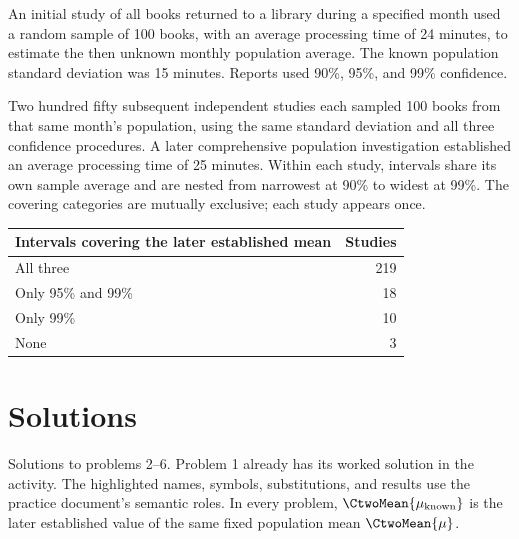 \noindent\begin{minipage}[t]{0.70\linewidth}
\vspace{0pt}
An initial study of all books returned to a library during a specified month used a random sample of 100 books, with an average processing time of 24 minutes, to estimate the then unknown monthly population average. The known population standard deviation was 15 minutes. Reports used 90\%, 95\%, and 99\% confidence.

Two hundred fifty subsequent independent studies each sampled 100 books from that same month's population, using the same standard deviation and all three confidence procedures. A later comprehensive population investigation established an average processing time of 25 minutes. Within each study, intervals share its own sample average and are nested from narrowest at 90\% to widest at 99\%. The covering categories are mutually exclusive; each study appears once.
\end{minipage}\hfill
\begin{minipage}[t]{0.28\linewidth}
\vspace{0pt}
\centering
\small
\setlength{\tabcolsep}{4pt}
\begin{tabularx}{\linewidth}{@{}>{\raggedright\arraybackslash}Xr@{}}\toprule
Intervals covering the later established mean & Studies\\\midrule
All three & 219\\
Only 95\% and 99\% & 18\\
Only 99\% & 10\\
None & 3\\
\bottomrule\end{tabularx}
\end{minipage}\par


\clearpage
{}
\begingroup
\linespread{1.12}\selectfont
\setlength{\parskip}{4pt}
\CtwoPracticeIntervalPalette
\section*{Solutions}
Solutions to problems 2--6. Problem 1 already has its worked solution in the activity.
The highlighted names, symbols, substitutions, and results use the practice document's semantic roles.
In every problem, $\CtwoMean{\mu_{\mathrm{known}}}$ is the later established value of the same fixed population mean $\CtwoMean{\mu}$.
